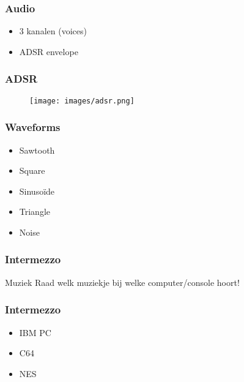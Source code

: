 \documentclass[aspectratio=43]{uva-inf-presentation}
\begin{document}

\begin{frame}
\frametitle{Audio}

\begin{itemize}
\item 3 kanalen (voices)
\item ADSR envelope
\end{itemize}

\end{frame}


\begin{frame}
\frametitle{ADSR}

\begin{figure}
\texttt{[image: images/adsr.png]}
\end{figure}

\end{frame}


\begin{frame}
\frametitle{Waveforms}

\begin{itemize}
\item Sawtooth
\item Square
\item Sinuso\"ide
\item Triangle
\item Noise
\end{itemize}

\end{frame}



\begin{frame}
\frametitle{Intermezzo}

\begin{block}{Muziek}
Raad welk muziekje bij welke computer/console hoort!
\end{block}

\end{frame}


\begin{frame}
\frametitle{Intermezzo}

\begin{itemize}
\item IBM PC
\item C64
\item NES
\end{itemize}

\end{frame}
\end{document}
